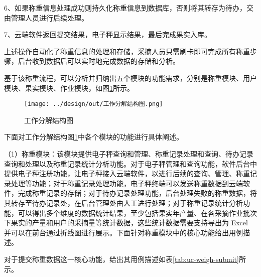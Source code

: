 6、如果称重信息处理成功则持久化称重信息到数据库，否则将其转存为待办，交由管理人员进行后续处理。

7、云端软件返回提交结果，电子秤显示结果，最后完成果实入库。

上述操作自动化了称重信息的处理和存储，采摘人员只需刷卡即可完成所有称重步骤，后台收到数据后可以实时地完成数据的存储和分析。

基于该称重流程，可以分析并归纳出五个模块的功能需求，分别是称重模块、用户模块、果实模块、作业模块，如图\ref{fig:工作分解结构图}所示。

\begin{figure}[H]
    \centering
    \texttt{[image: ../design/out/工作分解结构图.png]}
    \caption{工作分解结构图}
    \label{fig:工作分解结构图}
\end{figure}

下面对工作分解结构图\ref{fig:工作分解结构图}中各个模块的功能进行具体阐述。

（1）称重模块：该模块提供电子秤查询和管理、称重记录处理和查询、待办记录查询和处理以及称重记录统计分析功能。对于电子秤管理和查询功能，软件后台中提供电子秤注册功能，让电子秤接入云端软件，以进行后续的查询、管理、称重记录处理等功能；对于称重记录处理功能，电子秤终端可以发送称重数据到云端软件，完成称重记录的存储；对于待办记录处理功能，后台处理失败的称重数据，将其转存至待办记录处，在后台管理处由人工进行处理；对于称重记录统计分析功能，可以得出多个维度的数据统计结果，至少包括果实年产量、在各采摘作业批次下果实的产量和用户的采摘量等统计数据，这些统计数据需要支持导出为 Excel 并可以在前台通过折线图进行展示。下面针对称重模块中的核心功能给出用例描述。

对于提交称重数据这一核心功能，给出其用例描述如表\ref{tab:uc-weigh-submit}所示。

